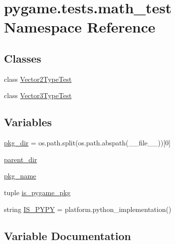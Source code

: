 \hypertarget{namespacepygame_1_1tests_1_1math__test}{}\section{pygame.\+tests.\+math\+\_\+test Namespace Reference}
\label{namespacepygame_1_1tests_1_1math__test}
\subsection*{Classes}
\begin{DoxyCompactItemize}
\item 
class \hyperlink{classpygame_1_1tests_1_1math__test_1_1_vector2_type_test}{Vector2\+Type\+Test}
\item 
class \hyperlink{classpygame_1_1tests_1_1math__test_1_1_vector3_type_test}{Vector3\+Type\+Test}
\end{DoxyCompactItemize}
\subsection*{Variables}
\begin{DoxyCompactItemize}
\item 
\hyperlink{namespacepygame_1_1tests_1_1math__test_af0e2164cc48a04abd289ac1ee8acb7cf}{pkg\+\_\+dir} = os.\+path.\+split(os.\+path.\+abspath(\+\_\+\+\_\+file\+\_\+\+\_\+))\mbox{[}0\mbox{]}
\item 
\hyperlink{namespacepygame_1_1tests_1_1math__test_a50ea1ec92fa57530bca367cdb4e23615}{parent\+\_\+dir}
\item 
\hyperlink{namespacepygame_1_1tests_1_1math__test_a97027dbfcbdbd359881d534f3e08c62b}{pkg\+\_\+name}
\item 
tuple \hyperlink{namespacepygame_1_1tests_1_1math__test_a676ad3937228db7422c833bc4f6975a0}{is\+\_\+pygame\+\_\+pkg}
\item 
string \hyperlink{namespacepygame_1_1tests_1_1math__test_ad7d5d270a19d9eb2dad5aae96b71aff8}{I\+S\+\_\+\+P\+Y\+PY} = platform.\+python\+\_\+implementation()
\end{DoxyCompactItemize}


\subsection{Variable Documentation}
\mbox{\label{namespacepygame_1_1tests_1_1math__test_a676ad3937228db7422c833bc4f6975a0}} 
